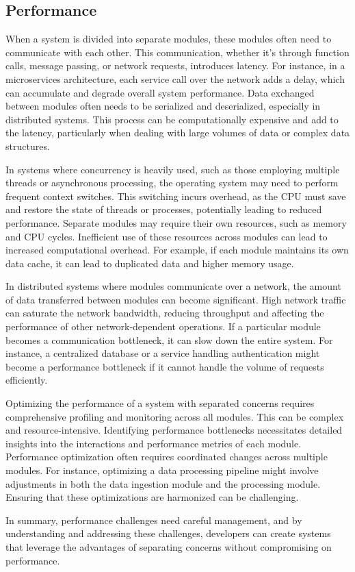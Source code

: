 \subsection{Performance}
When a system is divided into separate modules, these modules often need to communicate with each other. This communication, whether it’s through function calls, message passing, or network requests, introduces latency. For instance, in a microservices architecture, each service call over the network adds a delay, which can accumulate and degrade overall system performance.
Data exchanged between modules often needs to be serialized and deserialized, especially in distributed systems. This process can be computationally expensive and add to the latency, particularly when dealing with large volumes of data or complex data structures.
\par
In systems where concurrency is heavily used, such as those employing multiple threads or asynchronous processing, the operating system may need to perform frequent context switches. This switching incurs overhead, as the CPU must save and restore the state of threads or processes, potentially leading to reduced performance.
Separate modules may require their own resources, such as memory and CPU cycles. Inefficient use of these resources across modules can lead to increased computational overhead. For example, if each module maintains its own data cache, it can lead to duplicated data and higher memory usage.
\par
In distributed systems where modules communicate over a network, the amount of data transferred between modules can become significant. High network traffic can saturate the network bandwidth, reducing throughput and affecting the performance of other network-dependent operations.
If a particular module becomes a communication bottleneck, it can slow down the entire system. For instance, a centralized database or a service handling authentication might become a performance bottleneck if it cannot handle the volume of requests efficiently.
\par
Optimizing the performance of a system with separated concerns requires comprehensive profiling and monitoring across all modules. This can be complex and resource-intensive. Identifying performance bottlenecks necessitates detailed insights into the interactions and performance metrics of each module.
Performance optimization often requires coordinated changes across multiple modules. For instance, optimizing a data processing pipeline might involve adjustments in both the data ingestion module and the processing module. Ensuring that these optimizations are harmonized can be challenging.
\par
In summary, performance challenges  need careful management, and by understanding and addressing these challenges, developers can create systems that leverage the advantages of separating concerns without compromising on performance.

